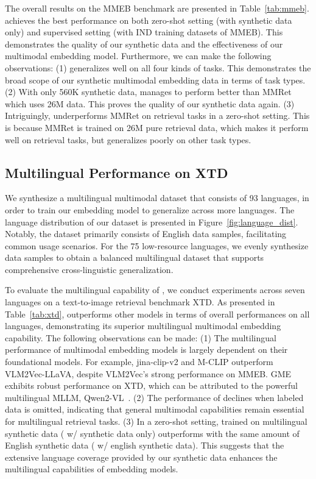 The overall results on the MMEB benchmark are presented in Table~\ref{tab:mmeb}.
\ours{} achieves the best performance on both zero-shot setting (with synthetic data only) and supervised setting (with IND training datasets of MMEB).
This demonstrates the quality of our synthetic data and the effectiveness of our multimodal embedding model.
Furthermore, we can make the following observations:
(1) \ours{} generalizes well on all four kinds of tasks.
This demonstrates the broad scope of our synthetic multimodal embedding data in terms of task types.
(2) With only 560K synthetic data, \ours{} manages to perform better than MMRet which uses 26M data.
This proves the quality of our synthetic data again.
(3) Intriguingly, \ours{} underperforms MMRet on retrieval tasks in a zero-shot setting.
This is because MMRet is trained on 26M pure retrieval data, which makes it perform well on retrieval tasks, but generalizes poorly on other task types.


\subsection{Multilingual Performance on XTD}


We synthesize a multilingual multimodal dataset that consists of 93 languages, in order to train our embedding model \ours{} to generalize across more languages.
The language distribution of our dataset is presented in Figure~\ref{fig:language_dist}.
Notably, the dataset primarily consists of English data samples, facilitating common usage scenarios.
For the 75 low-resource languages, we evenly synthesize data samples to obtain a balanced multilingual dataset that supports comprehensive cross-linguistic generalization.

To evaluate the multilingual capability of \ours{}, we conduct experiments across seven languages on a text-to-image retrieval benchmark XTD.
As presented in Table~\ref{tab:xtd}, \ours{} outperforms other models in terms of overall performances on all languages, demonstrating its superior multilingual multimodal embedding capability.
The following observations can be made:
(1) The multilingual performance of multimodal embedding models is largely dependent on their foundational models.
For example, jina-clip-v2 and M-CLIP outperform VLM2Vec-LLaVA, despite VLM2Vec's strong performance on MMEB.
GME exhibits robust performance on XTD, which can be attributed to the powerful multilingual MLLM, Qwen2-VL~\cite{Qwen2-VL}.
(2) The performance of \ours{} declines when labeled data is omitted, indicating that general multimodal capabilities remain essential for multilingual retrieval tasks.
(3) In a zero-shot setting, \ours{} trained on multilingual synthetic data (\ours{} w/ synthetic data only) outperforms \ours{} with the same amount of English synthetic data (\ours{} w/ english synthetic data).
This suggests that the extensive language coverage provided by our synthetic data enhances the multilingual capabilities of embedding models.

